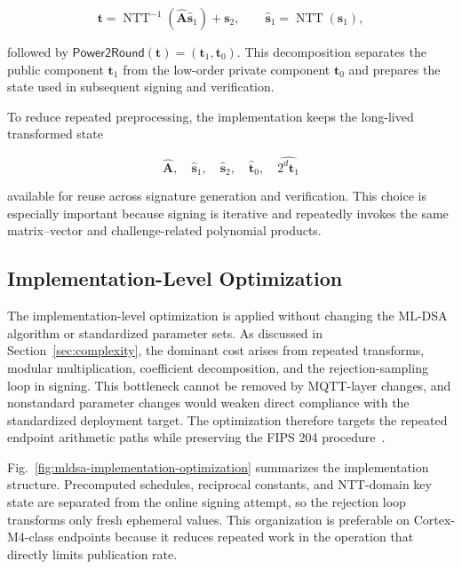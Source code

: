\documentclass[final, twoside]{IEEEtran} %
\begin{document}
\begin{equation}
\mathbf{t} = \operatorname{NTT}^{-1}\!\left(\hat{\mathbf{A}}\hat{\mathbf{s}}_1\right) + \mathbf{s}_2,
\qquad
\hat{\mathbf{s}}_1 = \operatorname{NTT}(\mathbf{s}_1),
\end{equation}

followed by $\mathsf{Power2Round}(\mathbf{t}) = (\mathbf{t}_1,\mathbf{t}_0)$. This decomposition separates the public component $\mathbf{t}_1$ from the low-order private component $\mathbf{t}_0$ and prepares the state used in subsequent signing and verification.

To reduce repeated preprocessing, the implementation keeps the long-lived transformed state

\begin{equation}
\hat{\mathbf{A}}, \quad \hat{\mathbf{s}}_1, \quad \hat{\mathbf{s}}_2, \quad \hat{\mathbf{t}}_0, \quad \widehat{2^d\mathbf{t}_1}
\end{equation}

available for reuse across signature generation and verification. This choice is especially important because signing is iterative and repeatedly invokes the same matrix--vector and challenge-related polynomial products.

\subsection{Implementation-Level Optimization}

The implementation-level optimization is applied without changing the ML-DSA algorithm or standardized parameter sets. As discussed in Section~\ref{sec:complexity}, the dominant cost arises from repeated transforms, modular multiplication, coefficient decomposition, and the rejection-sampling loop in signing. This bottleneck cannot be removed by MQTT-layer changes, and nonstandard parameter changes would weaken direct compliance with the standardized deployment target. The optimization therefore targets the repeated endpoint arithmetic paths while preserving the FIPS 204 procedure~\cite{NIST-FIPS-204}.

Fig.~\ref{fig:mldsa-implementation-optimization} summarizes the implementation structure. Precomputed schedules, reciprocal constants, and NTT-domain key state are separated from the online signing attempt, so the rejection loop transforms only fresh ephemeral values. This organization is preferable on Cortex-M4-class endpoints because it reduces repeated work in the operation that directly limits publication rate.
\end{document}
